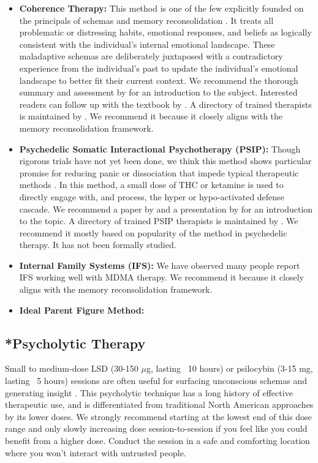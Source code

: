 \documentclass[12pt,letterpaper]{article}
\begin{document}
\begin{itemize}
    \item \textbf{Coherence Therapy:} This method is one of the few explicitly founded on the principals of schemas and memory reconsolidation \cite{eckerUnlocking}. It treats all problematic or distressing habits, emotional responses, and beliefs as logically consistent with the individual's internal emotional landscape. These maladaptive schemas are deliberately juxtaposed with a contradictory experience from the individual's past to update the individual's emotional landscape to better fit their current context. We recommend the thorough summary and assessment by \textcite{lesswrongCoherenceTherapy} for an introduction to the subject. Interested readers can follow up with the textbook by \textcite{eckerUnlocking}. A directory of trained therapists is maintained by \textcite{coherenceDirectory}. We recommend it because it closely aligns with the memory reconsolidation framework.
    \item \textbf{Psychedelic Somatic Interactional Psychotherapy (PSIP):} Though rigorous trials have not yet been done, we think this method shows particular promise for reducing panic or dissociation that impede typical therapeutic methods \cite{razviPSIP,ragnhildstveit2023cannabis}. In this method, a small dose of THC or ketamine is used to directly engage with, and process, the hyper or hypo-activated defense cascade. We recommend a paper by \textcite{razviPSIP} and a presentation by \textcite{razviPresentation} for an introduction to the topic. A directory of trained PSIP therapists is maintained by \textcite{psipDirectory}. We recommend it mostly based on popularity of the method in psychedelic therapy. It has not been formally studied.
    \item \textbf{Internal Family Systems (IFS):} We have observed many people report IFS working well with MDMA therapy. We recommend it because it closely aligns with the memory reconsolidation framework. 
    \item \textbf{Ideal Parent Figure Method:}
\end{itemize}
\subsection{*Psycholytic Therapy}
\label{psychedelics}
Small to medium-dose LSD (30-150 $\mu$g, lasting ~10 hours) or psilocybin (3-15 mg, lasting ~5 hours) sessions are often useful for surfacing unconscious schemas and generating insight \cite{passiePsycholytic}. This psycholytic technique has a long history of effective therapeutic use, and is differentiated from traditional North American approaches by its lower doses. We strongly recommend starting at the lowest end of this dose range and only slowly increasing dose session-to-session if you feel like you could benefit from a higher dose. Conduct the session in a safe and comforting location where you won't interact with untrusted people.
\end{document}
